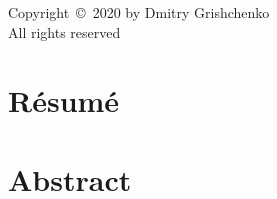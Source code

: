 \documentclass[12pt,singlespace]{mitthesis}
\begin{document}

%

\newpage
\null\vfill
\begin{center}
Copyright~\copyright~2020 by Dmitry Grishchenko\\
All rights reserved
\end{center}




\newpage

\begingroup
\let\cleardoublepage\clearpage

\chapter*{R\'esum\'e}


\chapter*{Abstract}


% 

\endgroup

\clearpage
{}





    


%     


% 








%     

%

\end{document}
